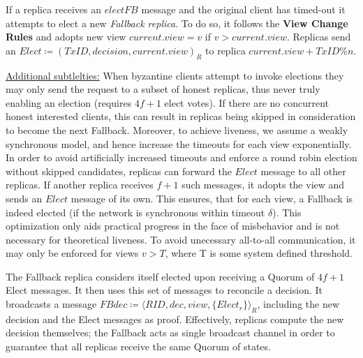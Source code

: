 
If a replica receives an $electFB$ message and the original client has timed-out it attempts to elect a new \textit{Fallback replica}. To do so, it follows the \textbf{View Change Rules} and adopts new view $current.view = v$ if $v > current.view$. 
Replicas send an $Elect \coloneqq (TxID, decision, current.view)_R$ to replica $current.view + TxID \% n$. 


\underline{Additional subtlelties:} 
When byzantine clients attempt to invoke elections they may only send the request to a subset of honest replicas, thus never truly enabling an election (requires $4f+1$ elect votes). If there are no concurrent honest interested clients, this can result in replicas being skipped in consideration to become the next Fallback. Moreover, to achieve liveness, we assume a weakly synchronous model, and hence increase the timeouts for each view exponentially.
In order to avoid artificially increased timeouts and enforce a round robin election without skipped candidates, replicas can forward the $Elect$ message to all other replicas. If another replica receives $f+1$ such messages, it adopts the view and sends an $Elect$ message of its own. This ensures, that for each view, a Fallback is indeed elected (if the network is synchronous within timeout $\delta$). This optimization only aids practical progress in the face of misbehavior and is not necessary for theoretical liveness. To avoid unecessary all-to-all communication, it may only be enforced for views $v > T$, where T is some system defined threshold.  



The Fallback replica considers itself elected upon receiving a Quorum of $4f+1$ Elect messages. It then uses this set of messages to reconcile a decision. It broadcasts a message $FBdec \coloneqq \langle RID, dec, view, \{Elect_r\} \rangle_R$, including the new decision and the Elect messages as proof. Effectively, replicas compute the new decision themselves; the Fallback acts as single broadcast channel in order to guarantee that all replicas receive the same Quorum of states.

